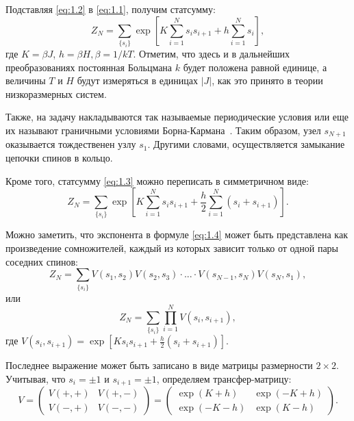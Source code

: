 Подставляя \eqref{eq:1.2} в \eqref{eq:1.1}, получим статсумму:
\begin{equation}
Z_{N}=\sum_{\{s_{i}\}} \exp\left[K\sum_{i=1}^{N} s_{i}s_{i+1}+h\sum_{i=1}^{N} s_{i}\right], 
\label{eq:1.3}
\end{equation}
где $K=\beta J$, $h=\beta H, \beta = 1/kT$. Отметим, что здесь и в  дальнейших преобразованиях  постоянная Больцмана $k$  будет положена равной единице, а величины $T$ и $H$  будут измеряться в единицах $|J|$, как это принято в теории низкоразмерных систем.

Также, на задачу накладываются так называемые периодические условия или еще их называют граничными условиями Борна-Кармана~\cite{mussardo2010}. Таким образом, узел $s_{N+1}$ оказывается тождественен узлу $s_{1}$. Другими словами, осуществляется замыкание цепочки спинов в кольцо.  

Кроме того, статсумму \eqref{eq:1.3} можно переписать в симметричном виде:
\begin{equation}
Z_{N}=\sum_{\{s_{i}\}} \exp\left[K\sum_{i=1}^{N} s_{i}s_{i+1}+\frac{h}{2}\sum_{i=1}^{N}( s_{i}+s_{i+1})\right].
\label{eq:1.4}
\end{equation}

Можно заметить, что экспонента в формуле \eqref{eq:1.4} может быть представлена как произведение сомножителей, каждый из которых зависит только от одной пары соседних спинов:
\begin{equation}
Z_{N}=\sum_{\{s_{i}\}} V(s_1,s_2)V(s_2,s_3)\cdot...\cdot V(s_{N-1},s_N)V(s_N,s_1),
\label{eq:1.5}
\end{equation}
или 
\begin{equation}
Z_{N}=\sum_{\{s_{i}\}} \prod_{i=1}^{N}  V(s_i,s_{i+1}),
\label{eq:1.6}
\end{equation}
где $V(s_i,s_{i+1})= \exp\left[K s_{i}s_{i+1}+\frac{h}{2} (s_{i}+s_{i+1})\right]$.

Последнее выражение может быть записано в виде матрицы размерности $2\times 2$. Учитывая, что $s_{i}=\pm 1$ и $s_{i+1}=\pm 1$, определяем трансфер-матрицу:
\begin{equation}
V=
\begin{pmatrix}
V(+,+)& V(+,-)\\
V(-,+)& V(-,-)
\end{pmatrix}
=
\begin{pmatrix}
\exp (K+h)& \exp (-K+h)\\
\exp (-K-h)&\exp (K-h)
\label{eq:1.7}
\end{pmatrix}.
\end{equation}

